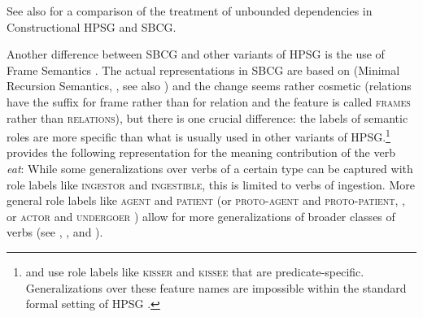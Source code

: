 \documentclass[output=paper,biblatex,babelshorthands,newtxmath,draftmode,colorlinks,citecolor=brown]{langscibook}
\begin{document}
See also  for a comparison of the treatment of unbounded dependencies in
Constructional HPSG and SBCG.

\label{sec-frame-semantics-SBCG}

Another difference between SBCG and other variants of HPSG is the use of Frame Semantics
\citep{Fillmore82a-u,Fillmore85b-u}. The actual representations in SBCG are based on \mrs (Minimal
Recursion Semantics, \citealt{CFPS2005a}, see also ) and
the change seems rather cosmetic (relations have the suffix  for frame rather than
 for relation and the feature is called \textsc{frames} rather than
\textsc{relations}), but there is one crucial difference: the labels of semantic roles
are more specific than what is usually used in other variants of HPSG.\footnote{%
  \citet[]{ps} and \citet{ps2} use role labels like \textsc{kisser} and \textsc{kissee} that are predicate-specific.
  Generalizations over these feature names are impossible within the standard formal setting of
  HPSG \parencites[Section~8.5.3]{ps2}[, Fn.~1]{Mueller99a}[Section~4.2.1]{Davis2001a-u}.%
}
\citet[]{Sag2012a} provides the following representation for the meaning contribution of the
verb \emph{eat}:
\ea
{}
\z
While some generalizations over verbs of a certain type can be captured with role labels like
\textsc{ingestor} and \textsc{ingestible}, this is limited to verbs of ingestion. More general role
labels like \textsc{agent} and \textsc{patient} (or \textsc{proto-agent} and \pagebreak\textsc{proto-patient},
\citealt{Dowty91a}, or \textsc{actor} and \textsc{undergoer} \citealt{VanValin99a-u}) allow for more generalizations of broader classes of verbs (see
\citealt{DK2000b-u}, \citealt[Section~4.2.1]{Davis2001a-u}, and ).

\end{document}
